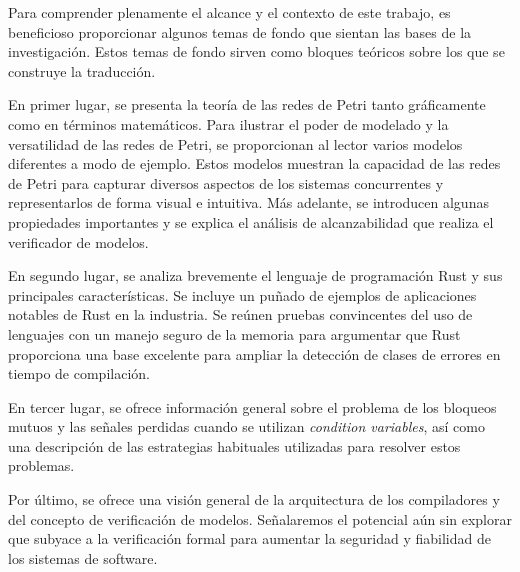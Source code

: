 Para comprender plenamente el alcance y el contexto de este trabajo, es beneficioso
proporcionar algunos temas de fondo que sientan las bases de la investigación. Estos temas de
fondo sirven como bloques teóricos sobre los que se construye la traducción.

En primer lugar, se presenta la teoría de las redes de Petri tanto gráficamente como en términos
matemáticos. Para ilustrar el poder de modelado y la versatilidad de las redes de Petri, se
proporcionan al lector varios modelos diferentes a modo de ejemplo. Estos modelos muestran
la capacidad de las redes de Petri para capturar diversos aspectos de los sistemas concurrentes y
representarlos de forma visual e intuitiva. Más adelante, se introducen algunas propiedades
importantes y se explica el análisis de alcanzabilidad que realiza el verificador de modelos.

En segundo lugar, se analiza brevemente el lenguaje de programación Rust
y sus principales características.
Se incluye un puñado de ejemplos de aplicaciones notables de Rust en la industria.
Se reúnen pruebas convincentes del uso de lenguajes con un manejo seguro de la memoria para
argumentar que Rust proporciona una base excelente para ampliar la detección de clases de
errores en tiempo de compilación.

En tercer lugar, se ofrece información general sobre el problema de los bloqueos mutuos y las señales
perdidas cuando se utilizan \textit{condition variables}, así como una descripción de las estrategias
habituales utilizadas para resolver estos problemas.

Por último, se ofrece una visión general de la arquitectura de los compiladores y del concepto
de verificación de modelos. Señalaremos el potencial aún sin explorar que subyace a la
verificación formal para aumentar la seguridad y fiabilidad de los sistemas de software.
